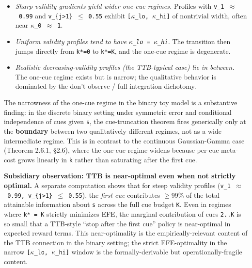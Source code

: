 \documentclass{article}
\providecommand{\tightlist}{\setlength{\itemsep}{0pt}\setlength{\parskip}{0pt}}
\begin{document}
\begin{itemize}
\tightlist
\item
  \emph{Sharp validity gradients yield wider one-cue regimes.} Profiles
  with \texttt{v\_1\ \ensuremath{\approx}\ 0.99} and
  \texttt{v\_\{j\textgreater{}1\}\ \ensuremath{\leq}\ 0.55} exhibit
  \texttt{{[}\ensuremath{\kappa}\_lo,\ \ensuremath{\kappa}\_hi{]}} of nontrivial width, often near
  \texttt{\ensuremath{\kappa}\_0\ \ensuremath{\approx}\ 1}.
\item
  \emph{Uniform validity profiles tend to have
  \texttt{\ensuremath{\kappa}\_lo\ =\ \ensuremath{\kappa}\_hi}.} The transition then jumps directly from
  \texttt{k*=0} to \texttt{k*=K}, and the one-cue regime is degenerate.
\item
  \emph{Realistic decreasing-validity profiles (the TTB-typical case)
  lie in between.} The one-cue regime exists but is narrow; the
  qualitative behavior is dominated by the don't-observe /
  full-integration dichotomy.
\end{itemize}

The narrowness of the one-cue regime in the binary toy model is a
substantive finding: in the discrete binary setting under symmetric
error and conditional independence of cues given \texttt{s}, the
cue-truncation theorem fires generically only at the \textbf{boundary}
between two qualitatively different regimes, not as a wide intermediate
regime. This is in contrast to the continuous Gaussian-Gamma case
(Theorem 2.6.1, \S{}2.6), where the one-cue regime widens because per-cue
meta-cost grows linearly in \texttt{k} rather than saturating after the
first cue.

\textbf{Subsidiary observation: TTB is near-optimal even when not
strictly optimal.} A separate computation shows that for steep validity
profiles (\texttt{v\_1\ \ensuremath{\approx}\ 0.99,\ v\_\{j\textgreater{}1\}\ \ensuremath{\leq}\ 0.55}),
the \emph{first cue} contributes \ensuremath{\geq}99\% of the total attainable
information about \texttt{s} across the full cue budget \texttt{K}. Even
in regimes where \texttt{k*\ =\ K} strictly minimizes EFE, the marginal
contribution of cues \texttt{2..K} is so small that a TTB-style ``stop
after the first cue'' policy is near-optimal in expected reward terms.
This near-optimality is the empirically-relevant content of the TTB
connection in the binary setting; the strict EFE-optimality in the
narrow \texttt{{[}\ensuremath{\kappa}\_lo,\ \ensuremath{\kappa}\_hi{]}} window is the formally-derivable but
operationally-fragile content.
\end{document}
